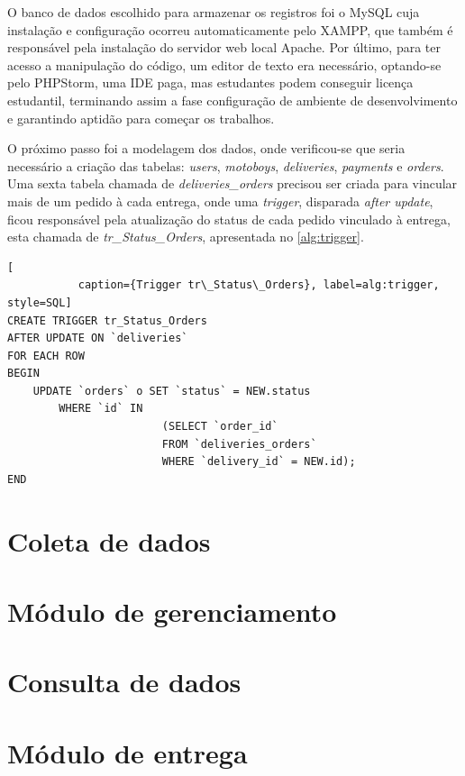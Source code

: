 O banco de dados escolhido para armazenar os registros foi o MySQL cuja instalação e configuração ocorreu automaticamente pelo XAMPP, que também é responsável pela instalação do servidor web local Apache. Por último, para ter acesso a manipulação do código, um editor de texto era necessário, optando-se pelo PHPStorm, uma IDE paga, mas estudantes podem conseguir licença estudantil, terminando assim a fase configuração de ambiente de desenvolvimento e garantindo aptidão para começar os trabalhos.

O próximo passo foi a modelagem dos dados, onde verificou-se que seria necessário a criação das tabelas: \textit{users}, \textit{motoboys}, \textit{deliveries}, \textit{payments} e \textit{orders}. Uma sexta tabela chamada de \textit{deliveries\_orders} precisou ser criada para vincular mais de um pedido à cada entrega, onde uma \textit{trigger}, disparada \textit{after update}, ficou responsável pela atualização do status de cada pedido vinculado à entrega, esta chamada de \textit{tr\_Status\_Orders}, apresentada no \autoref{alg:trigger}.

\begin{lstlisting}[
           caption={Trigger tr\_Status\_Orders}, label=alg:trigger, style=SQL]
CREATE TRIGGER tr_Status_Orders 
AFTER UPDATE ON `deliveries`
FOR EACH ROW 
BEGIN
    UPDATE `orders` o SET `status` = NEW.status
        WHERE `id` IN
                        (SELECT `order_id`
                        FROM `deliveries_orders`
                        WHERE `delivery_id` = NEW.id); 
END
\end{lstlisting}

\newpage
\section{Coleta de dados}


\section{Módulo de gerenciamento}


\section{Consulta de dados}


\section{Módulo de entrega}


